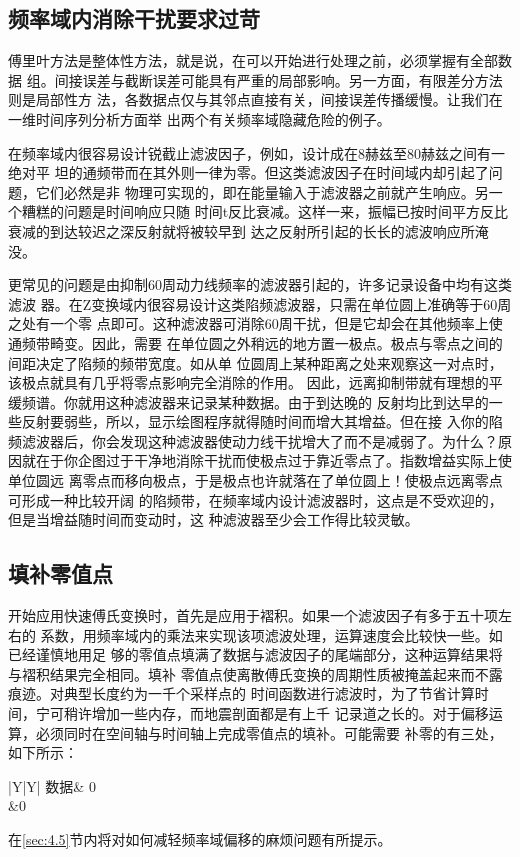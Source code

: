 \subsection{频率域内消除干扰要求过苛}
傅里叶方法是整体性方法，就是说，在可以开始进行处理之前，必须掌握有全部数据
组。间接误差与截断误差可能具有严重的局部影响。另一方面，有限差分方法则是局部性方
法，各数据点仅与其邻点直接有关，间接误差传播缓慢。让我们在一维时间序列分析方面举
出两个有关频率域隐藏危险的例子。

在频率域内很容易设计锐截止滤波因子，例如，设计成在8赫兹至80赫兹之间有一绝对平
坦的通频带而在其外则一律为零。但这类滤波因子在时间域内却引起了问题，它们必然是非
物理可实现的，即在能量输入于滤波器之前就产生响应。另一个糟糕的问题是时间响应只随
时间t反比衰减。这样一来，振幅已按时间平方反比衰减的到达较迟之深反射就将被较早到
达之反射所引起的长长的滤波响应所淹没。

更常见的问题是由抑制60周动力线频率的滤波器引起的，许多记录设备中均有这类滤波
器。在Z变换域内很容易设计这类陷频滤波器，只需在单位圆上准确等于60周之处有一个零
点即可。这种滤波器可消除60周干扰，但是它却会在其他频率上使通频带畸变。因此，需要
在单位圆之外稍远的地方置一极点。极点与零点之间的间距决定了陷频的频带宽度。如从单
位圆周上某种距离之处来观察这一对点时，该极点就具有几乎将零点影响完全消除的作用。
因此，远离抑制带就有理想的平缓频谱。你就用这种滤波器来记录某种数据。由于到达晚的
反射均比到达早的一些反射要弱些，所以，显示绘图程序就得随时间而增大其增益。但在接
入你的陷频滤波器后，你会发现这种滤波器使动力线干扰增大了而不是减弱了。为什么？原
因就在于你企图过于干净地消除干扰而使极点过于靠近零点了。指数增益实际上使单位圆远
离零点而移向极点，于是极点也许就落在了单位圆上！使极点远离零点可形成一种比较开阔
的陷频带，在频率域内设计滤波器时，这点是不受欢迎的，但是当增益随时间而变动时，这
种滤波器至少会工作得比较灵敏。

\subsection{填补零值点}
开始应用快速傅氏变换时，首先是应用于褶积。如果一个滤波因子有多于五十项左右的
系数，用频率域内的乘法来实现该项滤波处理，运算速度会比较快一些。如已经谨慎地用足
够的零值点填满了数据与滤波因子的尾端部分，这种运算结果将与褶积结果完全相同。填补
零值点使离散傅氏变换的周期性质被掩盖起来而不露痕迹。对典型长度约为一千个采样点的
时间函数进行滤波时，为了节省计算时间，宁可稍许增加一些内存，而地震剖面都是有上千
记录道之长的。对于偏移运算，必须同时在空间轴与时间轴上完成零值点的填补。可能需要
补零的有三处，如下所示：
\begin{table}[!ht]
\centering
\ttfamily
\small
\begin{tabularx}{\textwidth}{|Y|Y|}
\hline
 数据& 0 \\
{}&0\\
\hline


\end{tabularx}
\end{table}
在\ref{sec:4.5}节内将对如何减轻频率域偏移的麻烦问题有所提示。

